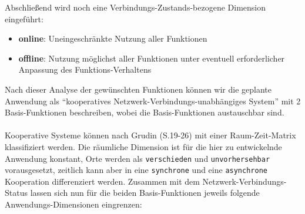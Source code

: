 Abschließend wird noch eine Verbindungs-Zustands-bezogene Dimension eingeführt:
\begin{itemize}[leftmargin=*,noitemsep,topsep=1ex,parsep=0pt,partopsep=0pt]
\item \textbf{online}: Uneingeschränkte Nutzung aller Funktionen
\item \textbf{offline}: Nutzung möglichst aller Funktionen unter eventuell erforderlicher Anpassung des Funktions-Verhaltens
\end{itemize}
\vspace{1ex}\noindent
Nach dieser Analyse der gewünschten Funktionen können wir die geplante Anwendung als "`kooperatives Netzwerk-Verbindungs-unabhängiges System"' mit 2 Basis-Funktionen beschreiben, wobei die Basis-Funktionen austauschbar sind.\\ \\
Kooperative Systeme können nach Grudin\cite{GRUDIN:CSCW} (S.19-26) mit einer Raum-Zeit-Matrix klassifiziert werden. Die räumliche Dimension ist für die hier zu entwickelnde Anwendung konstant, Orte werden als \texttt{verschieden} und \texttt{unvorhersehbar} vorausgesetzt, zeitlich kann aber in eine \texttt{synchrone} und eine \texttt{asynchrone} Kooperation differenziert werden. Zusammen mit dem Netzwerk-Verbindungs-Status lassen sich nun für die beiden Basis-Funktionen jeweils folgende Anwendungs-Dimensionen eingrenzen:\\
